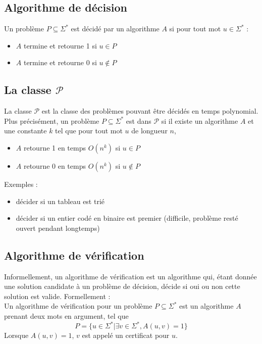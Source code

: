 \documentclass[a4paper]{article}
\begin{document}
  \subsection{Algorithme de décision}
  Un problème $P \subseteq \Sigma^*$ est décidé par un algorithme $A$ si pour 
  tout mot $u \in \Sigma^*$ : 
  \begin{itemize}
    \item $A$ termine et retourne 1 si $u \in P$
    \item $A$ termine et retourne 0 si $u \not \in P$
  \end{itemize}

  \subsection{La classe $\mathcal{P}$}
  La classe $\mathcal{P}$ est la classe des problèmes pouvant être décidés en temps
  polynomial. Plus précisément, un problème $P \subseteq \Sigma^*$ est dans $\mathcal{P}$
  si il existe un algorithme $A$ et une constante $k$ tel que pour tout mot $u$
  de longueur $n$, 
  \begin{itemize}
    \item $A$ retourne 1 en temps $O(n^k)$ si $u \in P$
    \item $A$ retourne 0 en temps $O(n^k)$ si $u \not \in P$
  \end{itemize}

  Exemples :
  \begin{itemize}
    \item décider si un tableau est trié
    \item décider si un entier codé en binaire est premier (difficile, problème
    resté ouvert pendant longtemps)
  \end{itemize}

  \subsection{Algorithme de vérification}
  Informellement, un algorithme de vérification est un algorithme qui, étant donnée
  une solution candidate à un problème de décision, décide si oui ou non cette
  solution est valide. Formellement : \\

  Un algorithme de vérification pour un problème $P \subseteq \Sigma^*$ est un
  algorithme $A$ prenant deux mots en argument, tel que 
  $$ P = \{ u \in \Sigma^* | \exists v \in \Sigma^*, A(u,v) =1 \} $$
  Lorsque $A(u,v) = 1$, $v$ est appelé un certificat pour $u$.
\end{document}
